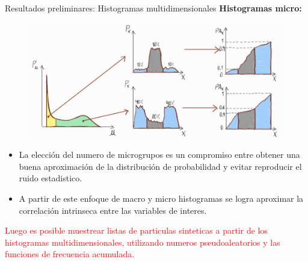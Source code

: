 \documentclass[aspectratio=169,english]{beamer}
\begin{document}
\begin{frame}[fragile]{Resultados preliminares: Histogramas multidimensionales}
    \textbf{Histogramas micro:}

    \begin{figure}
        \centering
        \includegraphics[width=0.55\linewidth]{imagens/esquema4.jpeg}
        \label{fig:esquema4}
    \end{figure}

    \begin{itemize}
        \item La elección del numero de microgrupos es un compromiso entre obtener una buena aproximación de la distribución de probabilidad y evitar reproducir el ruido estadistico.
        \item A partir de este enfoque de macro y micro histogramas se logra aproximar la correlación intrinseca entre las variables de interes.
    \end{itemize}


    \textcolor{red}{Luego es posible muestrear listas de particulas sinteticas a partir de los histogramas multidimensionales, utilizando numeros pseudoaleatorios y las funciones de frecuencia acumulada.}

     

\end{frame}
\end{document}
